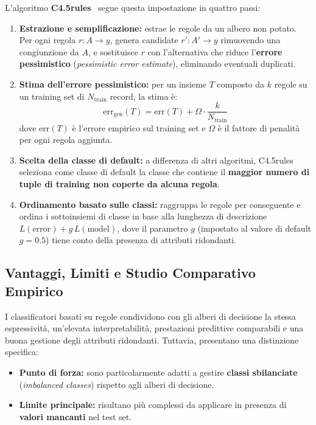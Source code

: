 L'algoritmo \textbf{C4.5rules}~\cite{quinlan1993} segue questa impostazione in quattro passi:
\begin{enumerate}
    \item \textbf{Estrazione e semplificazione:} estrae le regole da un albero non potato. Per ogni regola $r: A \rightarrow y$, genera candidate $r': A' \rightarrow y$ rimuovendo una congiunzione da $A$, e sostituisce $r$ con l'alternativa che riduce l'\textbf{errore pessimistico} (\textit{pessimistic error estimate}), eliminando eventuali duplicati.
    \item \textbf{Stima dell'errore pessimistico:} per un insieme $T$ composto da $k$ regole su un training set di $N_{\text{train}}$ record, la stima \`e:
    \begin{equation}
        \text{err}_{\text{gen}}(T) = \text{err}(T) + \Omega \cdot \frac{k}{N_{\text{train}}}
    \end{equation}
    dove $\text{err}(T)$ \`e l'errore empirico sul training set e $\Omega$ \`e il fattore di penalit\`a per ogni regola aggiunta.
    \item \textbf{Scelta della classe di default:} a differenza di altri algoritmi, C4.5rules seleziona come classe di default la classe che contiene il \textbf{maggior numero di tuple di training non coperte da alcuna regola}.
    \item \textbf{Ordinamento basato sulle classi:} raggruppa le regole per conseguente e ordina i sottoinsiemi di classe in base alla lunghezza di descrizione $L(\text{error}) + g \, L(\text{model})$, dove il parametro $g$ (impostato al valore di default $g = 0.5$) tiene conto della presenza di attributi ridondanti.
\end{enumerate}

\FloatBarrier
\subsection{Vantaggi, Limiti e Studio Comparativo Empirico}
\label{subsec:dm-rule-comparison}

I classificatori basati su regole condividono con gli alberi di decisione la stessa espressivit\`a, un'elevata interpretabilit\`a, prestazioni predittive comparabili e una buona gestione degli attributi ridondanti. Tuttavia, presentano una distinzione specifica:
\begin{itemize}
    \item \textbf{Punto di forza:} sono particolarmente adatti a gestire \textbf{classi sbilanciate} (\textit{imbalanced classes}) rispetto agli alberi di decisione.
    \item \textbf{Limite principale:} risultano pi\`u complessi da applicare in presenza di \textbf{valori mancanti} nel test set.
\end{itemize}

